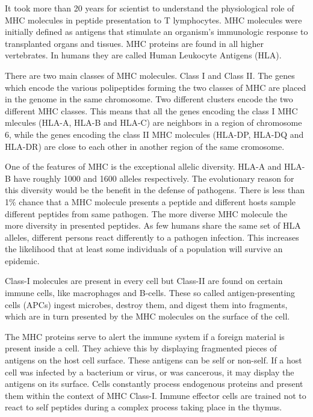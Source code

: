 
It took more than 20 years for scientist to understand the  physiological role of MHC molecules in peptide presentation to T lymphocytes. 
MHC molecules were initially defined as antigens that stimulate an organism’s immunologic response to transplanted organs and tissues. MHC proteins are found in all higher vertebrates. 
In humans they are called Human Leukocyte Antigens (HLA).

There are two main classes of MHC molecules. Class I and Class II. The genes which encode the various polipeptides forming the two classes of MHC are placed in the genome in the same chromosome.
Two different clusters encode the two different MHC classes. This means that all the genes encoding the class I MHC mlecules (HLA-A, HLA-B and HLA-C) are neighbors in a region of chromosome 6,
while the genes encoding the class II MHC molecules (HLA-DP, HLA-DQ and HLA-DR) are close to each other in another region of the same cromosome.

One of the features of MHC is the exceptional allelic diversity. HLA-A and HLA-B have roughly 1000 and 1600 alleles respectively. 
The evolutionary reason for this diversity would be the benefit in the defense of pathogens. 
There is less than 1\% chance that a MHC molecule presents a peptide and different hosts sample different peptides from same pathogen. 
The more diverse MHC molecule the more diversity in presented peptides. As few humans share the same set of HLA alleles, different persons react differently to a pathogen infection. 
This increases the likelihood that at least some individuals of a population will survive an epidemic.

Class-I molecules are present in every cell but Class-II are found on certain immune cells, like macrophages and B-cells. 
These so called antigen-presenting cells (APCs) ingest microbes, destroy them, and digest them into fragments, which are in turn presented by the MHC molecules on the surface of the cell.

The MHC proteins serve to alert the immune system if a foreign material is present inside a cell.
They achieve this by displaying fragmented pieces of antigens on the host cell surface. These antigens can be self or non-self. 
If a host cell was infected by a bacterium or virus, or was cancerous, it may  display the antigens on its surface.
Cells constantly process endogenous proteins and present them within the context of MHC Class-I. 
Immune effector cells are trained not to react to self peptides during a complex process taking place in the thymus.

